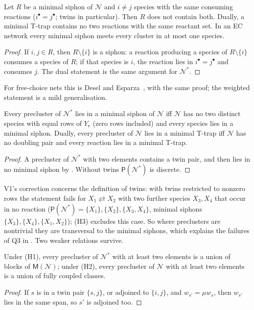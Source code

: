 \documentclass[11pt,a4paper]{report}
\newcommand{\Net}{\mathcal{N}}
\newcommand{\Nd}{\mathcal{N}^{*}}
\newcommand{\Ye}{Y_{\mathrm e}}
\newcommand{\Pre}{\mathsf{P}}
\newcommand{\Mips}{\mathsf{M}}
\begin{document}
\begin{theorem}\label{thm:transversal}
Let \(R\) be a minimal siphon of \(\Net\) and \(i\neq j\) species with the same consuming reactions
(\(i^\bullet=j^\bullet\); twins in particular). Then \(R\) does not contain both. Dually, a minimal T-trap contains no
two reactions with the same reactant set. In an EC network every minimal siphon meets every cluster in at most one
species.
\end{theorem}
\begin{proof}
If \(i,j\in R\), then \(R\setminus\{i\}\) is a siphon: a reaction producing a species of \(R\setminus\{i\}\) consumes a
species of \(R\); if that species is \(i\), the reaction lies in \(i^\bullet=j^\bullet\) and consumes \(j\). The dual
statement is the same argument for \(\Nd\).
\end{proof}

For free-choice nets this is Desel and Esparza~\autocite[Thm~4.30(a)]{DeselEsparza1995}, with the same proof; the
weighted statement is a mild generalisation.

\begin{theorem}\label{thm:B}
Every precluster of \(\Nd\) lies in a minimal siphon of \(\Net\) iff \(\Net\) has no two distinct species with equal
rows of \(\Ye\) (zero rows included) and every species lies in a minimal siphon. Dually, every precluster of \(\Net\)
lies in a minimal T-trap iff \(\Net\) has no doubling pair and every reaction lies in a minimal T-trap.
\end{theorem}
\begin{proof}
A precluster of \(\Nd\) with two elements contains a twin pair, and then lies in no minimal siphon by
. Without twins \(\Pre(\Nd)\) is discrete.
\end{proof}

V1's correction concerns the definition of twins: with twins restricted to nonzero rows the statement fails for
\(X_1\rightleftarrows X_2\) with two further species \(X_3,X_4\) that occur in no reaction (\(\Pre(\Nd)=\{X_1\},\{X_2\},
\{X_3,X_4\}\), minimal siphons \(\{X_3\},\{X_4\},\{X_1,X_2\}\)); (H3) excludes this case. So where preclusters are
nontrivial they are transversal to the minimal siphons, which explains the failures of Q3 in
. Two weaker relations survive.

\begin{proposition}\label{prop:H}
Under (H1), every precluster of \(\Nd\) with at least two elements is a union of blocks of \(\Mips(\Net)\); under
(H2), every precluster of \(\Net\) with at least two elements is a union of fully coupled classes.
\end{proposition}
\begin{proof}
If \(s\) is in a twin pair \(\{s,j\}\), or adjoined to \(\{i,j\}\), and \(w_{s'}=\mu w_s\), then \(w_{s'}\) lies in the
same span, so \(s'\) is adjoined too.
\end{proof}
\end{document}
